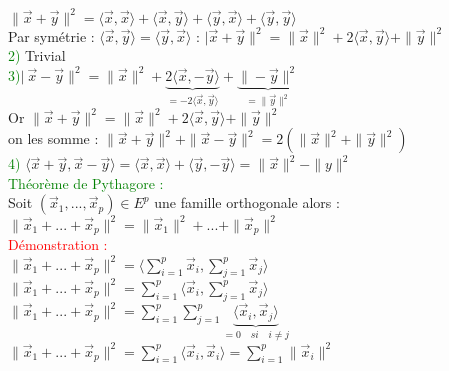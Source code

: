 \documentclass{article}
\begin{document}
$\| \vec x + \vec y \|^2= \langle \vec x, \vec x \rangle+ \langle \vec x, \vec y \rangle +\langle \vec y, \vec x \rangle + \langle \vec y, \vec y \rangle$ \\
Par symétrie : $\langle \vec x, \vec y \rangle =\langle \vec y, \vec x \rangle$ : $| \vec x + \vec y \|^2= \| \vec x \|^2 +2 \langle \vec x, \vec y \rangle + \| \vec y \|^2 $ \\
\textcolor{green}{2)} Trivial \\
\textcolor{green}{3)}$|\ \vec x - \vec y \|^2= \| \vec x \|^2 + \underbrace{2 \langle \vec x, - \vec y \rangle}_{=-2 \langle \vec x, \vec y \rangle} + \underbrace{\| - \vec y \|^2}_{=\| \vec y \|^2}$  \\
Or $\| \vec x +\vec y \|^2= \| \vec x \|^2 + 2 \langle \vec x , \vec y \rangle + \| \vec y \|^2$ \\
on les somme : $\| \vec x+ \vec y \|^2 + \| \vec x - \vec y \|^2= 2 (\|\vec x \|^2 + \| \vec y \|^2)$ \\
\textcolor{green}{4)} $\langle \vec x + \vec y , \vec  x - \vec y \rangle = \langle \vec x, \vec x \rangle + \langle \vec y, - \vec y \rangle = \| \vec x \|^2 - \| y \|^2$ \\
\textcolor{green}{Théorème de Pythagore :} \\
Soit $(\vec x_1,...,\vec x_p) \in E^p$ une famille orthogonale alors : \\
$\| \vec x_1 +...+ \vec x_p \|^2= \| \vec x_1 \|^2 + ... + \| \vec x_p\|^2$ \\
\textcolor{red}{Démonstration :} \\
$\| \vec x_1 +...+ \vec x_p \|^2= \langle \sum_{i=1}^p \vec x_i, \sum_{j=1}^p \vec x_j \rangle$ \\
$\| \vec x_1 +...+ \vec x_p \|^2= \sum_{i=1}^p \langle \vec x_i, \sum_{j=1}^p \vec x_j \rangle$ \\
$\| \vec x_1 +...+ \vec x_p \|^2= \sum_{i=1}^p \sum_{j=1}^p \underbrace{\langle \vec x_i , \vec x_j \rangle}_{=0 \quad si \quad i \neq j}$ \\
$\| \vec x_1 +...+ \vec x_p \|^2=\sum_{i=1}^p \langle \vec x_i, \vec x_i \rangle =\sum_{i=1}^p \| \vec x_i \|^2$
\end{document}
